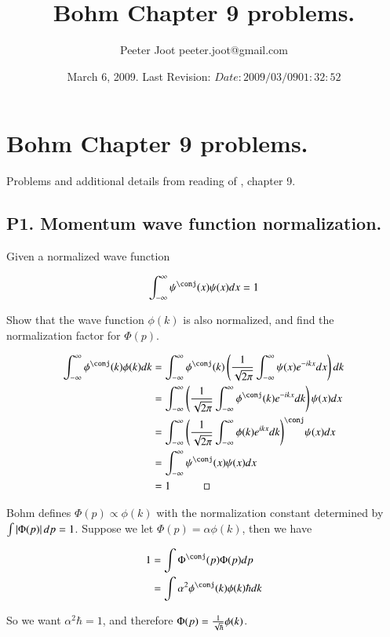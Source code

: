 \documentclass{article}
\title{ Bohm Chapter 9 problems. }
\author{Peeter Joot \quad peeter.joot@gmail.com }
\date{ March 6, 2009.  Last Revision: $Date: 2009/03/09 01:32:52 $ }
\newcommand{\IIinf}[0]{ \int_{-\infty}^\infty }
\begin{document}
\maketitle{}

\tableofcontents

\section{ Bohm Chapter 9 problems. }

Problems and additional details from reading of \cite{bohm1989qt}, chapter 9.

\subsection{ P1. Momentum wave function normalization. }

Given a normalized wave function

\begin{align*}
\IIinf \psi^\conj(x) \psi(x) dx = 1
\end{align*}

Show that the wave function $\phi(k)$ is also normalized, and find the normalization factor for $\Phi(p)$.

\begin{align*}
\IIinf \phi^\conj(k) \phi(k) dk 
&= 
\IIinf \phi^\conj(k) \left( \inv{\sqrt{2\pi}} \IIinf \psi(x) e^{-i k x} dx \right) dk  \\
&= 
\IIinf \left( \inv{\sqrt{2\pi}} \IIinf \phi^\conj(k) e^{-i k x} dk \right) \psi(x) dx  \\
&= 
\IIinf {\left( \inv{\sqrt{2\pi}} \IIinf \phi(k) e^{i k x} dk \right)}^\conj \psi(x) dx  \\
&= 
\IIinf \psi^\conj(x) \psi(x) dx  \\
&= 1 \quad\quad\quad \square
\end{align*}

Bohm defines $\Phi(p) \propto \phi(k)$ with the normalization constant determined by $\int \left\lvert{\Phi(p)}\right\rvert dp = 1$.  Suppose we 
let $\Phi(p) = \alpha \phi(k)$, then we have

\begin{align*}
1 
&= \int \Phi^\conj(p) \Phi(p) dp \\
&= \int \alpha^2 \phi^\conj(k) \phi(k) \hbar d k
\end{align*}

So we want $\alpha^2 \hbar = 1$, and therefore $\Phi(p) = \frac{1}{\sqrt{\hbar}} \phi(k)$.
\end{document}
